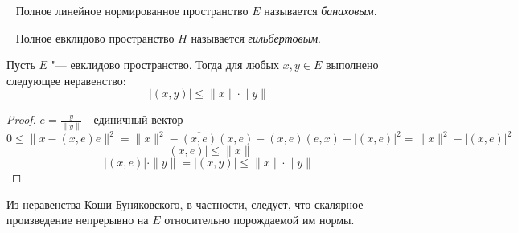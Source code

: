 \begin{definition}~ Полное линейное нормированное пространство $E$ называется \textit{банаховым}.
\end{definition}

\begin{definition}~ Полное евклидово пространство $H$ называется \textit{гильбертовым}.
\end{definition}

\begin{corollary}
	Пусть $E$ "--- евклидово пространство. Тогда для любых $x, y \in E$ выполнено следующее неравенство:
	\[|(x, y)| \leqslant \|x\| \cdot \|y\|\]
\end{corollary}

\begin{proof}
$e = \frac{y}{\|y\|}$ - единичный вектор
 $$0 \leqslant \|x - (x,e)e\|^2 = \|x\|^2 - \overline{(x,e)}(x,e) - (x,e)(e,x) + |(x,e)|^2 = \|x\|^2 - |(x,e)|^2$$
 $$|(x,e)| \leqslant \|x\|$$
 $$|(x,e)|\cdot\|y\| = |(x,y)| \leqslant \|x\| \cdot \|y\|$$
\end{proof}

\begin{note}
	Из неравенства Коши-Буняковского, в частности, следует, что скалярное произведение непрерывно на $E$ относительно порождаемой им нормы.
\end{note}
